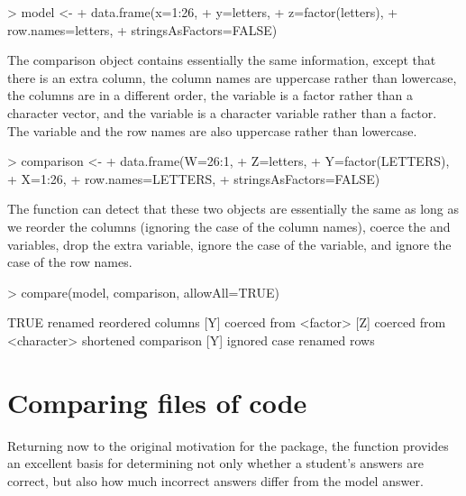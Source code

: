 \begin{Schunk}
\begin{Sinput}
> model <- 
+     data.frame(x=1:26, 
+                y=letters, 
+                z=factor(letters),
+                row.names=letters,
+                stringsAsFactors=FALSE)
\end{Sinput}
\end{Schunk}
The comparison object contains essentially the same
information, except that there is an extra column, the
column names are uppercase rather than lowercase, the columns
are in a different order,
the  variable is a factor rather than a 
character vector, and the  variable is a
character variable rather than a factor.  The
 variable and the row names are also uppercase rather than lowercase.

\begin{Schunk}
\begin{Sinput}
> comparison <- 
+     data.frame(W=26:1,
+                Z=letters,
+                Y=factor(LETTERS), 
+                X=1:26, 
+                row.names=LETTERS,
+                stringsAsFactors=FALSE)
\end{Sinput}
\end{Schunk}
The  function can detect that these
two objects are essentially the same as long as
we reorder the columns (ignoring the case of the column names),
coerce the  and  variables, drop
the extra variable, ignore the case of the  variable,
and ignore the case of the row names.

\begin{Schunk}
\begin{Sinput}
> compare(model, comparison, allowAll=TRUE)
\end{Sinput}
\begin{Soutput}
TRUE
  renamed
  reordered columns
  [Y] coerced from <factor>
  [Z] coerced from <character>
  shortened comparison
  [Y] ignored case
  renamed rows
\end{Soutput}
\end{Schunk}

\section*{Comparing files of \R{} code}

Returning now to the original motivation for the  package,
the  function provides an excellent basis for determining
not only whether a student's answers are correct, but also how much
incorrect answers differ from the model answer.

